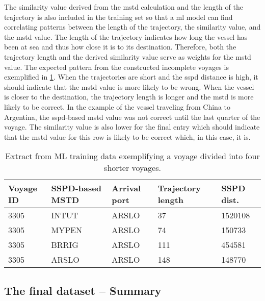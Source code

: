 The similarity value derived from the \acrshort{mstd} calculation and the length of the trajectory is also included in the training set so that a \acrshort{ml} model can find correlating patterns between the length of the trajectory, the similarity value, and the \acrshort{mstd} value. The length of the trajectory indicates how long the vessel has been at sea and thus how close it is to its destination. Therefore, both the trajectory length and the derived similarity value serve as weights for the \acrshort{mstd} value. The expected pattern from the constructed incomplete voyages is exemplified in \cref{tab:incomplete_voyage}. When the trajectories are short and the \acrshort{sspd} distance is high, it should indicate that the \acrshort{mstd} value is more likely to be wrong. When the vessel is closer to the destination, the trajectory length is longer and the \acrshort{mstd} is more likely to be correct. In the example of the vessel traveling from China to Argentina, the \acrshort{sspd}-based \acrshort{mstd} value was not correct until the last quarter of the voyage. The similarity value is also lower for the final entry which should indicate that the \acrshort{mstd} value for this row is likely to be correct which, in this case, it is.

\begin{table}[htbp]
    \centering
    \small{\begin{tabularx}{0.9\textwidth}{X X X X X}
        \bfseries{Voyage ID} & \bfseries{SSPD-based MSTD} & \bfseries{Arrival port} & \bfseries{Trajectory length} & \bfseries{SSPD dist.} \\ \toprule
        3305 & INTUT & ARSLO & 37 & 1520108 \\ \midrule
        3305 & MYPEN & ARSLO & 74 & 150733 \\ \midrule
        3305 & BRRIG & ARSLO & 111 & 454581 \\ \midrule
        3305 & ARSLO & ARSLO & 148 & 148770 \\ \bottomrule
    \end{tabularx}}
\caption{Extract from ML training data exemplifying a voyage divided into four shorter voyages.}\label{tab:incomplete_voyage}
\end{table}

\subsection{The final dataset -- Summary}

